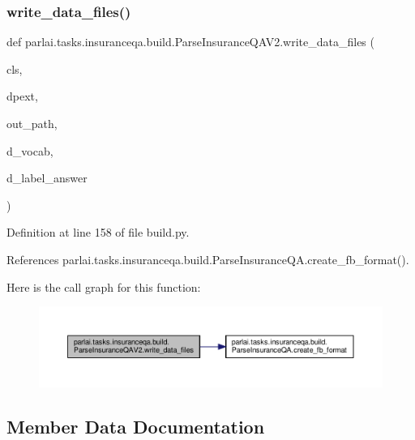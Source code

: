 \subsubsection{\texorpdfstring{write\+\_\+data\+\_\+files()}{write\_data\_files()}}
{\footnotesize\ttfamily def parlai.\+tasks.\+insuranceqa.\+build.\+Parse\+Insurance\+Q\+A\+V2.\+write\+\_\+data\+\_\+files (\begin{DoxyParamCaption}\item[{}]{cls,  }\item[{}]{dpext,  }\item[{}]{out\+\_\+path,  }\item[{}]{d\+\_\+vocab,  }\item[{}]{d\+\_\+label\+\_\+answer }\end{DoxyParamCaption})}



Definition at line 158 of file build.\+py.



References parlai.\+tasks.\+insuranceqa.\+build.\+Parse\+Insurance\+Q\+A.\+create\+\_\+fb\+\_\+format().

Here is the call graph for this function\+:
\nopagebreak
\begin{figure}[H]
\begin{center}
\leavevmode
\includegraphics[width=350pt]{classparlai_1_1tasks_1_1insuranceqa_1_1build_1_1ParseInsuranceQAV2_a8a510d31a4f0b733beb887de3c8379b0_cgraph}
\end{center}
\end{figure}


\subsection{Member Data Documentation}
\mbox{\label{classparlai_1_1tasks_1_1insuranceqa_1_1build_1_1ParseInsuranceQAV2_a60ef361268188ec13f71fc9a436d3d7d}} 
